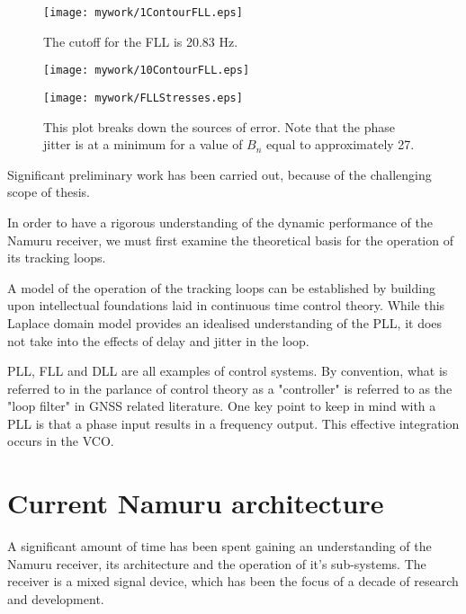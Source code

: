 \begin{figure}[!htb] 
    \centering
    \texttt{[image: mywork/1ContourFLL.eps]} 
    \caption{The cutoff for the FLL is 20.83 Hz.}
\end{figure}

\begin{figure}[!htb] 
    \centering
    \texttt{[image: mywork/10ContourFLL.eps]} 
    \caption{}
\end{figure}



\begin{figure}[!htb] 
    \centering
    \texttt{[image: mywork/FLLStresses.eps]} 
    \caption{This plot breaks down the sources of error. Note that the phase jitter is at a minimum for a value of $B_n$ equal to approximately 27.}
\end{figure}






Significant preliminary work has been carried out, because of the challenging scope of thesis. 

In order to have a rigorous understanding of the dynamic performance of the Namuru receiver, we must first examine the theoretical basis for the operation of its tracking loops. 

A model of the operation of the tracking loops can be established by building upon intellectual foundations laid in continuous time control theory. While this Laplace domain model provides an idealised understanding of the \ac{PLL}, it does not take into the effects of delay and jitter in the loop. 

\ac{PLL}, \ac{FLL} and \ac{DLL} are all examples of control systems. By convention, what is referred to in the parlance of control theory as a "controller" is referred to as the "loop filter" in \ac{GNSS} related literature. One key point to keep in mind with a \ac{PLL} is that a phase input results in a frequency output. This effective integration occurs in the \ac{VCO}.

\section{Current Namuru architecture}
A significant amount of time has been spent gaining an understanding of the Namuru receiver, its architecture and the operation of it's sub-systems. The receiver is a mixed signal device, which has been the focus of a decade of research and development. 

